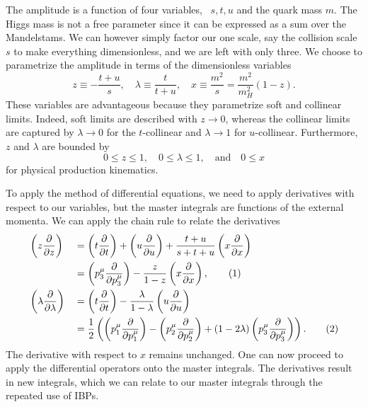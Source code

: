 The amplitude is a function of four variables, \eg\ $s, t, u$ and the quark mass $m$. The Higgs mass is not a free parameter since it can be expressed as a sum over the Mandelstams. We can however simply factor our one scale, say the collision scale $s$ to make everything dimensionless, and we are left with only three. We choose to parametrize the amplitude in terms of the dimensionless variables
\begin{equation}
z \equiv - \frac{t + u}{s}, \quad \lambda \equiv \frac{t}{t + u}, \quad x \equiv \frac{m^2}{s} = \frac{m^2}{m_H^2} (1 - z).
\label{eq:5:physical_parameter_space}
\end{equation}
These variables are advantageous because they parametrize soft and collinear limits. Indeed, soft limits are described with $z \rightarrow 0$, whereas the collinear limits are captured by $\lambda \rightarrow 0$ for the $t$-collinear and $\lambda \rightarrow 1$ for $u$-collinear. Furthermore, $z$ and $\lambda$ are bounded by
\begin{equation}
0 \le z \le 1, \quad 0 \le \lambda \le 1, \quad \text{and} \quad 0 \le x
\end{equation}
for physical production kinematics.

To apply the method of differential equations, we need to apply derivatives with respect to our variables, but the master integrals are functions of the external momenta. We can apply the chain rule to relate the derivatives
\begin{alignat*}{2}
\refstepcounter{equation}
&\left(z \frac{\partial }{\partial z} \right) &&= \left(t \frac{\partial }{ \partial t} \right) + \left( u \frac{\partial}{ \partial u} \right) + \frac{t + u}{s + t + u} \left(x \frac{\partial}{ \partial x} \right) \\
& &&= \left(p_3^\mu \frac{\partial}{\partial p_3^\mu} \right) - \frac{z}{1 - z} \left(x \frac{\partial }{\partial x} \right), \tag{\theequation} \\
\refstepcounter{equation}
& \left(\lambda \frac{\partial}{\partial \lambda}\right) && = \left(t \frac{\partial}{\partial t} \right) - \frac{\lambda}{1 - \lambda} \left(u \frac{\partial}{\partial u} \right) \\
& &&= \frac{1}{2} \left( \left(p_1^\mu \frac{\partial}{\partial p_1^\mu} \right) - \left(p_2^\mu \frac{\partial}{\partial p_2^\mu} \right) + (1 - 2 \lambda) \left(p_3^\mu \frac{\partial}{\partial p_3^\mu} \right)\right).  \tag{\theequation}
\end{alignat*}
The derivative with respect to $x$ remains unchanged. One can now proceed to apply the differential operators onto the master integrals. The derivatives result in new integrals, which we can relate to our master integrals through the repeated use of \acs{IBP}s.

